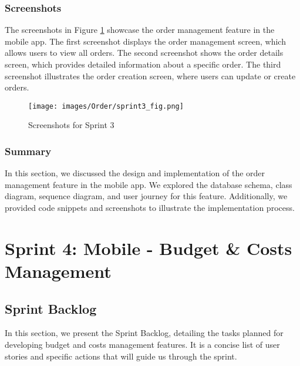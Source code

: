 \subsubsection{Screenshots}

The screenshots in Figure \ref{fig:screenshots_sprint3} showcase the order management feature in the mobile app. The first screenshot displays the order management screen, which allows users to view all orders. The second screenshot shows the order details screen, which provides detailed information about a specific order. The third screenshot illustrates the order creation screen, where users can update or create orders.

\begin{figure}[H]
    \centering
    \texttt{[image: images/Order/sprint3\_fig.png]}
    \caption{Screenshots for Sprint 3}
    \label{fig:screenshots_sprint3}
\end{figure}

\subsubsection{Summary}

In this section, we discussed the design and implementation of the order management feature in the mobile app. We explored the database schema, class diagram, sequence diagram, and user journey for this feature. Additionally, we provided code snippets and screenshots to illustrate the implementation process.

\section{Sprint 4: Mobile - Budget \& Costs Management}

\subsection{Sprint Backlog}

In this section, we present the Sprint Backlog, detailing the tasks planned for developing budget and costs management features. It is a concise list of user stories and specific actions that will guide us through the sprint.

